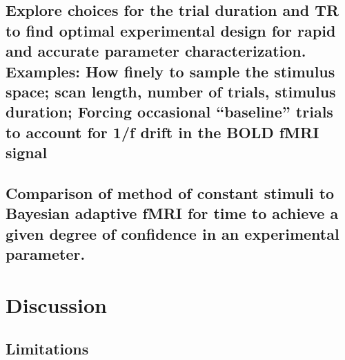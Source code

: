 \documentclass[
  english,
  man,floatsintext]{apa6}
\begin{document}
\hypertarget{explore-choices-for-the-trial-duration-and-tr-to-find-optimal-experimental-design-for-rapid-and-accurate-parameter-characterization.-examples-how-finely-to-sample-the-stimulus-space-scan-length-number-of-trials-stimulus-duration-forcing-occasional-baseline-trials-to-account-for-1f-drift-in-the-bold-fmri-signal}{%
\subsection{\texorpdfstring{Explore choices for the trial duration and TR to find optimal experimental design for rapid and accurate parameter characterization. Examples: How finely to sample the stimulus space; scan length, number of trials, stimulus duration; Forcing occasional \enquote{baseline} trials to account for 1/f drift in the BOLD fMRI signal}{Explore choices for the trial duration and TR to find optimal experimental design for rapid and accurate parameter characterization. Examples: How finely to sample the stimulus space; scan length, number of trials, stimulus duration; Forcing occasional ``baseline'' trials to account for 1/f drift in the BOLD fMRI signal}}\label{explore-choices-for-the-trial-duration-and-tr-to-find-optimal-experimental-design-for-rapid-and-accurate-parameter-characterization.-examples-how-finely-to-sample-the-stimulus-space-scan-length-number-of-trials-stimulus-duration-forcing-occasional-baseline-trials-to-account-for-1f-drift-in-the-bold-fmri-signal}}

\hypertarget{comparison-of-method-of-constant-stimuli-to-bayesian-adaptive-fmri-for-time-to-achieve-a-given-degree-of-confidence-in-an-experimental-parameter.}{%
\subsection{Comparison of method of constant stimuli to Bayesian adaptive fMRI for time to achieve a given degree of confidence in an experimental parameter.}\label{comparison-of-method-of-constant-stimuli-to-bayesian-adaptive-fmri-for-time-to-achieve-a-given-degree-of-confidence-in-an-experimental-parameter.}}

\hypertarget{discussion}{%
\section{Discussion}\label{discussion}}

\hypertarget{limitations}{%
\subsection{Limitations}\label{limitations}}
\end{document}
